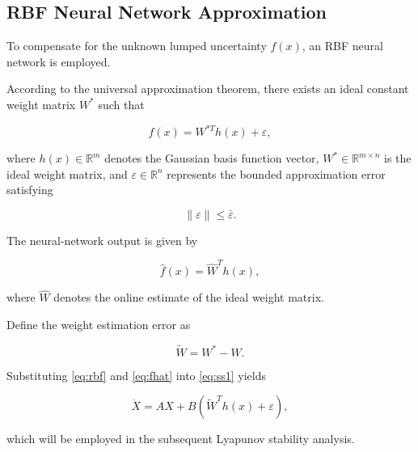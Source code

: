 
\subsection{RBF Neural Network Approximation}

To compensate for the unknown lumped uncertainty $f(x)$, an RBF neural network is employed.

According to the universal approximation theorem, there exists an ideal constant weight matrix $W^*$ such that

\begin{equation}
	f(x)
	=
	W^{*T}h(x)
	+
	\varepsilon,
	\label{eq:rbf}
\end{equation}

where $h(x)\in\mathbb{R}^{m}$ denotes the Gaussian basis function vector, $W^*\in\mathbb{R}^{m\times n}$ is the ideal weight matrix, and $\varepsilon\in\mathbb{R}^{n}$ represents the bounded approximation error satisfying

\begin{equation}
	\|\varepsilon\|
	\le
	\bar\varepsilon.
\end{equation}

The neural-network output is given by

\begin{equation}
	\hat f(x)
	=
	\hat W^Th(x),
	\label{eq:fhat}
\end{equation}

where $\hat W$ denotes the online estimate of the ideal weight matrix.

Define the weight estimation error as

\begin{equation}
	\tilde W
	=
	W^*
	-
	\hat W.
	\label{eq:weight}
\end{equation}

Substituting \eqref{eq:rbf} and \eqref{eq:fhat} into \eqref{eq:ss1} yields

\begin{equation}
	\dot X
	=
	AX
	+
	B
	\left(
	\tilde W^Th(x)
	+
	\varepsilon
	\right),
	\label{eq:ss}
\end{equation}

which will be employed in the subsequent Lyapunov stability analysis.